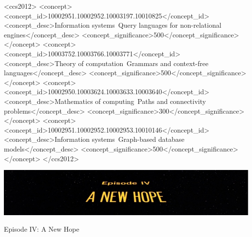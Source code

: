 \documentclass[sigconf,edbt]{acmart-edbt2021}
\begin{document}
%
\begin{CCSXML}
		<ccs2012>
		<concept>
			<concept_id>10002951.10002952.10003197.10010825</concept_id>
			<concept_desc>Information systems~Query languages for non-relational engines</concept_desc>
			<concept_significance>500</concept_significance>
		</concept>
		<concept>
			<concept_id>10003752.10003766.10003771</concept_id>
			<concept_desc>Theory of computation~Grammars and context-free languages</concept_desc>
			<concept_significance>500</concept_significance>
		</concept>
		<concept>
			<concept_id>10002950.10003624.10003633.10003640</concept_id>
			<concept_desc>Mathematics of computing~Paths and connectivity problems</concept_desc>
			<concept_significance>300</concept_significance>
		</concept>
		<concept>
			<concept_id>10002951.10002952.10002953.10010146</concept_id>
			<concept_desc>Information systems~Graph-based database models</concept_desc>
			<concept_significance>500</concept_significance>
		</concept>
		</ccs2012>
\end{CCSXML}
	



\begin{teaserfigure}
  \includegraphics[width=\textwidth]{new_hope.png}
  \caption{Episode IV: A New Hope}
  \label{fig:teaser}
\end{teaserfigure}

\maketitle





%





%
\end{document}

